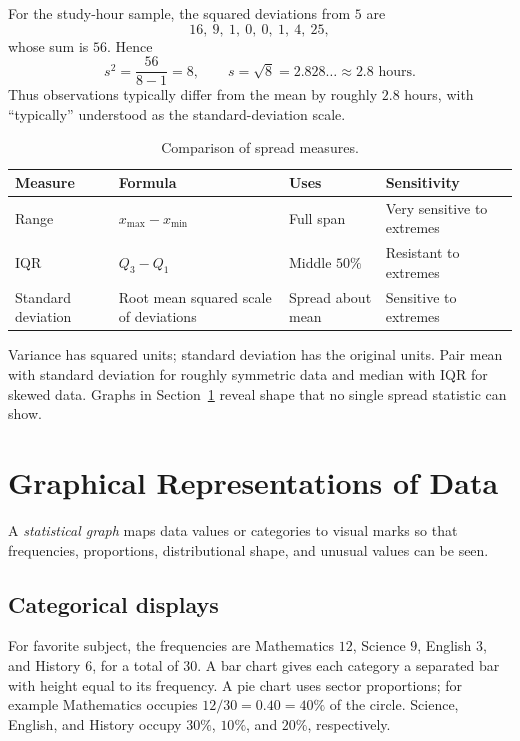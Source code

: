 \documentclass[11pt]{article}
\begin{document}
For the study-hour sample, the squared deviations from $5$ are
\[
16,\ 9,\ 1,\ 0,\ 0,\ 1,\ 4,\ 25,
\]
whose sum is $56$.  Hence
\[
s^2=\frac{56}{8-1}=8,
\qquad s=\sqrt{8}=2.828\ldots\approx2.8\text{ hours}.
\]
Thus observations typically differ from the mean by roughly $2.8$ hours,
with ``typically'' understood as the standard-deviation scale.

\begin{table}[ht]
\centering
\caption{Comparison of spread measures.}
\begin{tabularx}{\textwidth}{@{}lYYY@{}}
\toprule
Measure & Formula & Uses & Sensitivity \\
\midrule
Range & $x_{\max}-x_{\min}$ & Full span & Very sensitive to extremes \\
IQR & $Q_3-Q_1$ & Middle $50\%$ & Resistant to extremes \\
Standard deviation & Root mean squared scale of deviations & Spread about mean & Sensitive to extremes \\
\bottomrule
\end{tabularx}
\end{table}

\begin{keybox}
Variance has squared units; standard deviation has the original units.
Pair mean with standard deviation for roughly symmetric data and median with
IQR for skewed data.  Graphs in Section~\ref{sec:graphs} reveal shape that
no single spread statistic can show.
\end{keybox}

\section{Graphical Representations of Data}\label{sec:graphs}
A \emph{statistical graph} maps data values or categories to visual marks so
that frequencies, proportions, distributional shape, and unusual values can
be seen.

\subsection{Categorical displays}
For favorite subject, the frequencies are Mathematics $12$, Science $9$,
English $3$, and History $6$, for a total of $30$.  A bar chart gives each
category a separated bar with height equal to its frequency.  A pie chart
uses sector proportions; for example Mathematics occupies
$12/30=0.40=40\%$ of the circle.  Science, English, and History occupy
$30\%$, $10\%$, and $20\%$, respectively.
\end{document}

